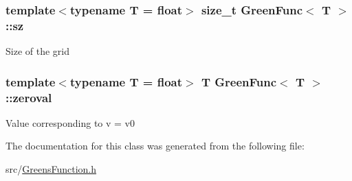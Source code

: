 \subsubsection[{sz}]{\setlength{\rightskip}{0pt plus 5cm}template$<$typename T = float$>$ size\+\_\+t {\bf Green\+Func}$<$ T $>$\+::sz\hspace{0.3cm}{\ttfamily [private]}}\label{class_green_func_a420f781055af7fe367fca14f8ffa0b2f}
Size of the grid \hypertarget{class_green_func_a8cb6151b747b186376aed30508f9b1bc}{}
\subsubsection[{zeroval}]{\setlength{\rightskip}{0pt plus 5cm}template$<$typename T = float$>$ T {\bf Green\+Func}$<$ T $>$\+::zeroval\hspace{0.3cm}{\ttfamily [private]}}\label{class_green_func_a8cb6151b747b186376aed30508f9b1bc}
Value corresponding to v = v0 

The documentation for this class was generated from the following file\+:\begin{DoxyCompactItemize}
\item 
src/\hyperlink{_greens_function_8h}{Greens\+Function.\+h}\end{DoxyCompactItemize}
